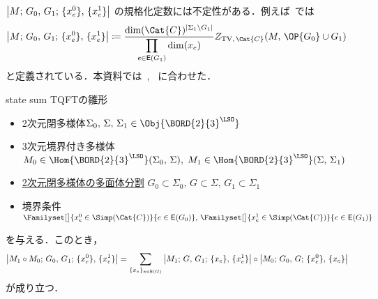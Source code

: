 \documentclass[TQFT_main]{subfiles}
\begin{document}
\begin{marker}
    $\abs{M;\, G_0,\, G_1;\, \{x^0_e\},\, \{x^1_e\}}$ の規格化定数には不定性がある．例えば~\cite[p.282]{Turaev2017}では
    \begin{align}
        \abs{M;\, G_0,\, G_1;\, \{x^0_e\},\, \{x^1_e\}} &\coloneqq \frac{\dim(\Cat{C})^{\abs{\Sigma_1 \setminus G_1}}}{\displaystyle\prod_{e \in \mathsf{E} (G_1)} \dim (x_e)} Z_{\text{TV},\, \Cat{C}} (M,\, \OP{G_0} \cup G_1)
    \end{align}
    と定義されている．本資料では~\cite[Definition 4.2.]{KirillovBalsam2010TVBW}, ~\cite[p.36]{AFM2020}に合わせた．
\end{marker}


\begin{mylem}[label=lem:statesum-preTQFT]{state sum TQFTの雛形}
    \begin{itemize}
        \item 2次元閉多様体$\Sigma_0,\, \Sigma,\, \Sigma_1 \in \Obj{\BORD{2}{3}^{\LSO}}$ 
        \item 3次元境界付き多様体 $M_0 \in \Hom{\BORD{2}{3}^{\LSO}}(\Sigma_0,\, \Sigma),\; M_1 \in \Hom{\BORD{2}{3}^{\LSO}} (\Sigma,\, \Sigma_1)$
        \item \hyperref[def:skeleton-2mfd]{2次元閉多様体の多面体分割} $G_0 \subset \Sigma_0,\, G \subset \Sigma,\, G_1 \subset \Sigma_1$
        \item 境界条件 $\Familyset[\big]{x^0_e \in \Simp(\Cat{C})}{e \in \mathsf{E}(G_0)},\, \Familyset[\big]{x^1_e \in \Simp(\Cat{C})}{e \in \mathsf{E}(G_1)}$
    \end{itemize}
    を与える．このとき，
    \begin{align}
        \abs{M_1 \circ M_0;\, G_0,\, G_1;\, \{x^0_e\},\, \{x^1_e\}}
        &= \sum_{\{x_e\}_{e \in \mathsf{E}(G)}} \abs{M_1;\, G,\, G_1;\, \{x_e\},\, \{x^1_e\}} \circ \abs{M_0;\, G_0,\, G;\, \{x^0_e\},\, \{x_e\}}
    \end{align}
    が成り立つ．
\end{mylem}
\end{document}
